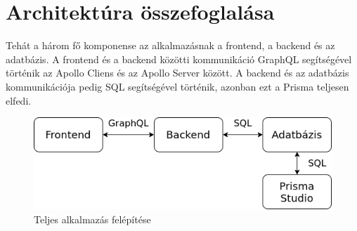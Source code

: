 
\section{Architektúra összefoglalása}
Tehát a három fő komponense az alkalmazásnak a frontend, a backend és az adatbázis.
A frontend és a backend közötti kommunikáció GraphQL segítségével történik az Apollo Cliens és az Apollo Server között.
A backend és az adatbázis kommunikációja pedig SQL segítségével történik, azonban ezt a Prisma teljesen elfedi.

\begin{figure}[!ht]
  \centering
  \includegraphics[width=150mm, keepaspectratio]{figures/architecture.png}
  \caption{Teljes alkalmazás felépítése}
  \label{fig:architecture}
\end{figure}